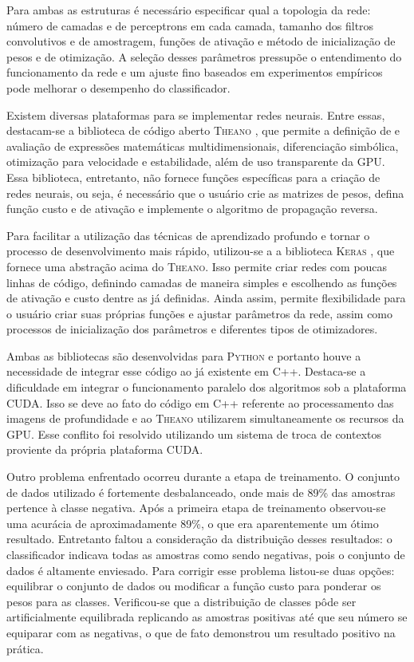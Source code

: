 Para ambas as estruturas é necessário especificar qual a topologia da rede: número de camadas e de perceptrons em cada camada, tamanho dos filtros convolutivos e de amostragem, funções de ativação e método de inicialização de pesos e de otimização.  A seleção desses parâmetros pressupõe o entendimento do funcionamento da rede e um ajuste fino baseados em experimentos empíricos pode melhorar o desempenho do classificador.

Existem diversas plataformas para se implementar redes neurais. Entre essas, destacam-se a biblioteca de código aberto \textsc{Theano} \cite{theano}, que permite a definição de e avaliação de expressões matemáticas multidimensionais, diferenciação simbólica, otimização para velocidade e estabilidade, além de uso transparente da GPU. Essa biblioteca, entretanto, não fornece funções específicas para a criação de redes neurais, ou seja, é necessário que o usuário crie as matrizes de pesos, defina função custo e de ativação e implemente o algoritmo de propagação reversa.

Para facilitar a utilização das técnicas de aprendizado profundo e tornar o processo de desenvolvimento mais rápido, utilizou-se a a biblioteca \textsc{Keras} \cite{keras}, que fornece uma abstração acima do \textsc{Theano}. Isso permite criar redes com poucas linhas de código, definindo camadas de maneira simples e escolhendo as funções de ativação e custo dentre as já definidas. Ainda assim, permite flexibilidade para o usuário criar suas próprias funções e ajustar parâmetros da rede, assim como processos de inicialização dos parâmetros e diferentes tipos de otimizadores.

Ambas as bibliotecas são desenvolvidas para \textsc{Python} e portanto houve a necessidade de integrar esse código ao já existente em C++. Destaca-se a dificuldade em integrar o funcionamento paralelo dos algoritmos sob a plataforma CUDA. Isso se deve ao fato do código em C++ referente ao processamento das imagens de profundidade e ao \textsc{Theano} utilizarem simultaneamente os recursos da GPU. Esse conflito foi resolvido utilizando um sistema de troca de contextos proviente da própria plataforma CUDA.

Outro problema enfrentado ocorreu durante a etapa de treinamento. O conjunto de dados utilizado é fortemente desbalanceado, onde mais de 89\% das amostras pertence à classe negativa. Após a primeira etapa de treinamento observou-se uma acurácia de aproximadamente 89\%, o que era aparentemente um ótimo resultado. Entretanto faltou a consideração da distribuição desses resultados: o classificador indicava todas as amostras como sendo negativas, pois o conjunto de dados é altamente enviesado. Para corrigir esse problema listou-se duas opções: equilibrar o conjunto de dados ou modificar a função custo para ponderar os pesos para as classes. Verificou-se que a distribuição de classes pôde ser artificialmente equilibrada replicando as amostras positivas até que seu número se equiparar com as negativas, o que de fato demonstrou um resultado positivo na prática.

